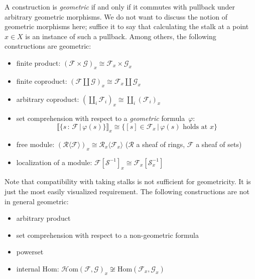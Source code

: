 \documentclass[10pt]{amsart}
\theoremstyle{definition}
\theoremstyle{plain}
\theoremstyle{remark}
\newcommand{\F}{\mathcal{F}}
\renewcommand{\G}{\mathcal{G}}
\newcommand{\R}{\mathcal{R}}
\renewcommand{\S}{\mathcal{S}}
\newcommand{\Hom}{\mathrm{Hom}}
\newcommand{\HOM}{\mathcal{H}\mathrm{om}}
\newcommand{\?}{\,{:}\,}
\renewcommand{\_}{\mathpunct{.}\,}
\newcommand{\brak}[1]{{\llbracket{#1}\rrbracket}}
\begin{document}
A construction is \emph{geometric} if and only if it commutes with pullback
under arbitrary geometric morphisms. We do not want to discuss the notion of
geometric morphisms here; suffice it to say that calculating the stalk at a
point~$x \in X$ is an instance of such a pullback. Among others, the following
constructions are geometric:
\begin{itemize}
\item finite product: $(\F \times \G)_x \cong \F_x \times \G_x$
\item finite coproduct: $(\F \amalg \G)_x \cong \F_x \amalg \G_x$
\item arbitrary coproduct: $(\coprod_i \F_i)_x \cong \coprod_i (\F_i)_x$
\item set comprehension with respect to a \emph{geometric} formula~$\varphi$:
\[ \brak{\{ s\?\F \,|\, \varphi(s) \}}_x \cong \{ [s]\in\F_x \,|\,
\text{$\varphi(s)$ holds at $x$} \} \]
\item free module: $(\R\langle \F \rangle)_x \cong \R_x\langle \F_x
\rangle$ ($\R$ a sheaf of rings, $\F$ a sheaf of sets)
\item localization of a module: $\F[\S^{-1}]_x \cong \F_x[\S_x^{-1}]$
\end{itemize}
Note that compatibility with taking stalks is not sufficient for geometricity.
It is just the most easily visualized requirement.
The following constructions are not in general geometric:
\begin{itemize}
\item arbitrary product
\item set comprehension with respect to a non-geometric formula
\item powerset
\item internal Hom: $\HOM(\F,\G)_x \not\cong \Hom(\F_x,\G_x)$
\end{itemize}
\end{document}
